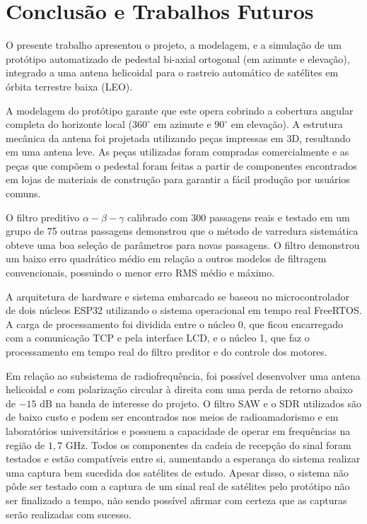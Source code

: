 \chapter{Conclusão e Trabalhos Futuros}\label{cap:Conclusão}

O presente trabalho apresentou o projeto, a modelagem, e a simulação de um protótipo automatizado de pedestal bi-axial ortogonal (em azimute e elevação), integrado a uma antena helicoidal para o rastreio automático de satélites em órbita terrestre baixa (LEO).

A modelagem do protótipo garante que este opera cobrindo a cobertura angular completa do horizonte local ($360^\circ$ em azimute e $90^\circ$ em elevação).
A estrutura mecânica da antena foi projetada utilizando peças impressas em 3D, resultando em uma antena leve.
As peças utilizadas foram compradas comercialmente e as peças que compõem o pedestal foram feitas a partir de componentes encontrados em lojas de materiais de construção para garantir a fácil produção por usuários comuns.

O filtro preditivo $\alpha-\beta-\gamma$ calibrado com 300 passagens reais e testado em um grupo de 75 outras passagens demonstrou que o método de varredura sistemática obteve uma boa seleção de parâmetros para novas passagens.
O filtro demonstrou um baixo erro quadrático médio em relação a outros modelos de filtragem convencionais, possuindo o menor erro RMS médio e máximo.

A arquitetura de hardware e sistema embarcado se baseou no microcontrolador de dois núcleos ESP32 utilizando o sistema operacional em tempo real FreeRTOS.
A carga de processamento foi dividida entre o núcleo 0, que ficou encarregado com a comunicação TCP e pela interface LCD, e o núcleo 1, que faz o processamento em tempo real do filtro preditor e do controle dos motores.

Em relação ao subsistema de radiofrequência, foi possível desenvolver uma antena helicoidal e com polarização circular à direita com uma perda de retorno abaixo de $-15 \text{ dB}$ na banda de interesse do projeto.
O filtro SAW e o SDR utilizados são de baixo custo e podem ser encontrados nos meios de radioamadorismo e em laboratórios universitários e possuem a capacidade de operar em frequências na região de $1,7 \text{ GHz}$.
Todos os componentes da cadeia de recepção do sinal foram testados e estão compatíveis entre si, aumentando a esperança do sistema realizar uma captura bem sucedida dos satélites de estudo.
Apesar disso, o sistema não pôde ser testado com a captura de um sinal real de satélites pelo protótipo não ser finalizado a tempo, não sendo possível afirmar com certeza que as capturas serão realizadas com sucesso.

